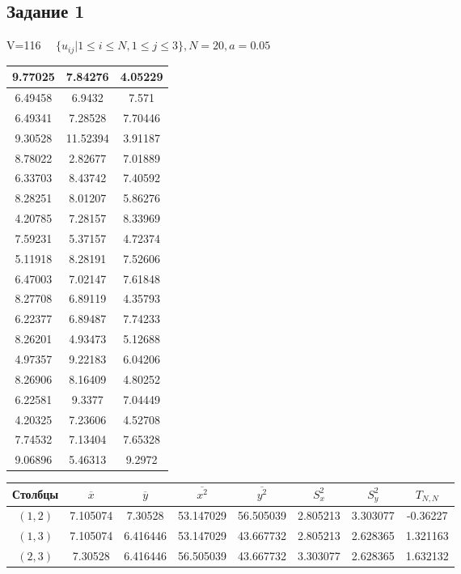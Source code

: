 \subsection{Задание 1}%
\label{subsec:1}%
%
V=116%
$\quad \{ u_{ij}|1 \le i \le N, 1\le j \le 3 \}, N=20, a =0.05 $

%
\begin{changemargin}{0cm}{0cm}\small{%
\center%
\begin{tabular}{|c|c|c|}%
\hline%
9.77025&7.84276&4.05229\\%
\hline%
6.49458&6.9432&7.571\\%
\hline%
6.49341&7.28528&7.70446\\%
\hline%
9.30528&11.52394&3.91187\\%
\hline%
8.78022&2.82677&7.01889\\%
\hline%
6.33703&8.43742&7.40592\\%
\hline%
8.28251&8.01207&5.86276\\%
\hline%
4.20785&7.28157&8.33969\\%
\hline%
7.59231&5.37157&4.72374\\%
\hline%
5.11918&8.28191&7.52606\\%
\hline%
6.47003&7.02147&7.61848\\%
\hline%
8.27708&6.89119&4.35793\\%
\hline%
6.22377&6.89487&7.74233\\%
\hline%
8.26201&4.93473&5.12688\\%
\hline%
4.97357&9.22183&6.04206\\%
\hline%
8.26906&8.16409&4.80252\\%
\hline%
6.22581&9.3377&7.04449\\%
\hline%
4.20325&7.23606&4.52708\\%
\hline%
7.74532&7.13404&7.65328\\%
\hline%
9.06896&5.46313&9.2972\\%
\hline%
\end{tabular}%
\newline%
\newline%
%
}\end{changemargin}%
\begin{changemargin}{-1.5cm}{0cm}\small{%
\center%
\begin{tabular}{|c|c|c|c|c|c|c|c|}%
\hline%
Столбцы&$\overline{x}$&$\overline{y}$&$\overline{x^2}$&$\overline{y^2}$&$S_{x}^2$&$S_{y}^2$&$T_{N,N}$\\%
\hline%
$(1,2)$&7.105074&7.30528&53.147029&56.505039&2.805213&3.303077&{-}0.36227\\%
\hline%
$(1,3)$&7.105074&6.416446&53.147029&43.667732&2.805213&2.628365&1.321163\\%
\hline%
$(2,3)$&7.30528&6.416446&56.505039&43.667732&3.303077&2.628365&1.632132\\%
\hline%
\end{tabular}%
\newline%
\newline%
%
}\end{changemargin}%

